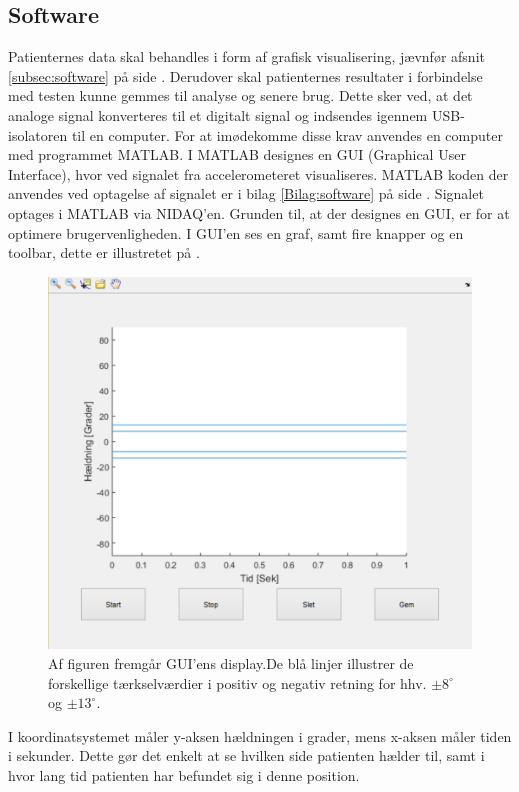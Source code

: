 \subsection{Software}
Patienternes data skal behandles i form af grafisk visualisering, jævnfør afsnit \ref{subsec:software} på side \pageref{subsec:software}. Derudover skal patienternes resultater i forbindelse med testen kunne gemmes til analyse og senere brug. Dette sker ved, at det analoge signal konverteres til et digitalt signal og indsendes igennem USB-isolatoren til en computer. For at imødekomme disse krav anvendes en computer med programmet MATLAB. I MATLAB designes en GUI (Graphical User Interface), hvor ved signalet fra accelerometeret visualiseres. MATLAB koden der anvendes ved optagelse af signalet er i bilag \ref{Bilag:software} på side \pageref{Bilag:software}. Signalet optages i MATLAB via NIDAQ'en. Grunden til, at der designes en GUI, er for at optimere brugervenligheden. I GUI'en ses en graf, samt fire knapper og en toolbar, dette er illustretet på . 
\begin{figure}[H] 
	\centering 
	\includegraphics[scale=0.5]{figures/cProblemloesning/GUI_generisk.PNG}
	\caption{Af figuren fremgår GUI'ens display.De blå linjer illustrer de forskellige tærkselværdier i positiv og negativ retning for hhv. $\pm 8^{\circ}$ og $\pm 13^{\circ}$.}
	\label{Fig:GUI_generisk}
\end{figure} 
I koordinatsystemet måler y-aksen hældningen i grader, mens x-aksen måler tiden i sekunder. Dette gør det enkelt at se hvilken side patienten hælder til, samt i hvor lang tid patienten har befundet sig i denne position.
